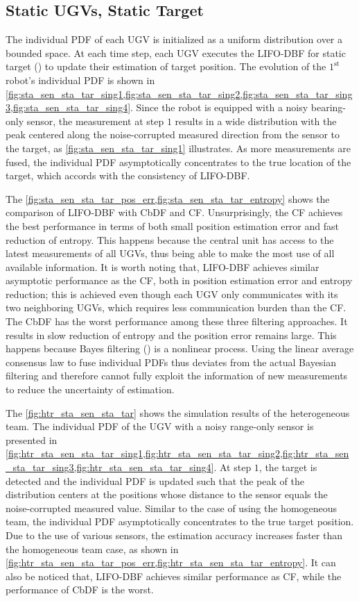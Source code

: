 \documentclass[journal]{IEEEtranTIE}
\theoremstyle{remark}
\begin{document}
	\subsection{Static UGVs, Static Target}
	The individual PDF of each UGV is initialized as a uniform distribution over a bounded space. 
	At each time step, each UGV executes the LIFO-DBF for static target () to update their estimation of target position.
	The evolution of the $1^\text{st}$ robot's individual PDF is shown in \cref{fig:sta_sen_sta_tar_sing1,fig:sta_sen_sta_tar_sing2,fig:sta_sen_sta_tar_sing3,fig:sta_sen_sta_tar_sing4}. 
	Since the robot is equipped with a noisy bearing-only sensor, the measurement at step $1$ results in a wide distribution with the peak centered along the noise-corrupted measured direction from the sensor to the target, as \cref{fig:sta_sen_sta_tar_sing1} illustrates.
	As more measurements are fused, the individual PDF asymptotically concentrates to the true location of the target, which accords with the consistency of LIFO-DBF.
	
	The \cref{fig:sta_sen_sta_tar_pos_err,fig:sta_sen_sta_tar_entropy} shows the comparison of LIFO-DBF with CbDF and CF.
	Unsurprisingly, the CF achieves the best performance in terms of both small position estimation error and fast reduction of entropy. 
	This happens because the central unit has access to the latest measurements of all UGVs, thus being able to make the most use of all available information.
	It is worth noting that, LIFO-DBF achieves similar asymptotic performance as the CF, both in position estimation error and entropy reduction; this is achieved even though each UGV only communicates with its two neighboring UGVs, which requires less communication burden than the CF.
	The CbDF has the worst performance among these three filtering approaches. 
	It results in slow reduction of entropy and the position error remains large.
	This happens because Bayes filtering () is a nonlinear process.
	Using the linear average consensus law to fuse individual PDFs thus deviates from the actual Bayesian filtering and therefore cannot fully exploit the information of new measurements to reduce the uncertainty of estimation.
	
	The \cref{fig:htr_sta_sen_sta_tar} shows the simulation results of the heterogeneous team.
	The individual PDF of the UGV with a noisy range-only sensor is presented in \cref{fig:htr_sta_sen_sta_tar_sing1,fig:htr_sta_sen_sta_tar_sing2,fig:htr_sta_sen_sta_tar_sing3,fig:htr_sta_sen_sta_tar_sing4}.
	At step $1$, the target is detected and the individual PDF is updated such that the peak of the  distribution centers at the positions whose distance to the sensor equals the noise-corrupted measured value. 
	Similar to the case of using the homogeneous team, the individual PDF asymptotically concentrates to the true target position.
	Due to the use of various sensors, the estimation accuracy increases faster than the homogeneous team case, as shown in \cref{fig:htr_sta_sen_sta_tar_pos_err,fig:htr_sta_sen_sta_tar_entropy}.
	It can also be noticed that, LIFO-DBF achieves similar performance as CF, while the performance of CbDF is the worst.
	
\end{document}
